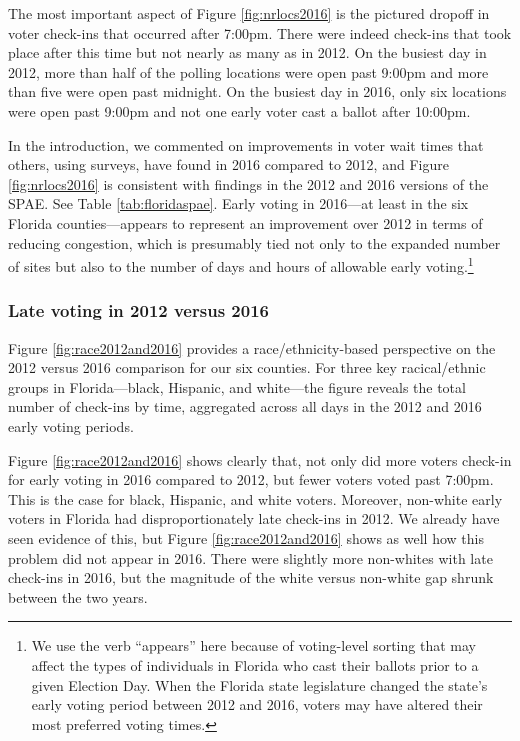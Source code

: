 \documentclass[12pt,titlepage]{article}
\begin{document}
The most important aspect of Figure \ref{fig:nrlocs2016} is the
pictured dropoff in voter check-ins that occurred after 7:00pm.  There
were indeed check-ins that took place after this time but not nearly
as many as in 2012.  On the busiest day in 2012, more than half of the
polling locations were open past 9:00pm and more than five were open
past midnight.  On the busiest day in 2016, only six locations were
open past 9:00pm and not one early voter cast a ballot after 10:00pm.

In the introduction, we commented on improvements in voter wait times
that others, using surveys, have found in 2016 compared to 2012, and
Figure \ref{fig:nrlocs2016} is consistent with findings in the 2012
\citep{spae2012} and 2016 \citep{spae2016} versions of the SPAE.  See
Table \ref{tab:floridaspae}.  Early voting in 2016---at least in the
six Florida counties---appears to represent an improvement over 2012
in terms of reducing congestion, which is presumably tied not only to
the expanded number of sites but also to the number of days and hours
of allowable early voting.\footnote{We use the verb ``appears'' here
  because of voting-level sorting that may affect the types of
  individuals in Florida who cast their ballots prior to a given
  Election Day.  When the Florida state legislature changed the
  state's early voting period between 2012 and 2016, voters may have
  altered their most preferred voting times.}



\subsubsection*{Late voting in 2012 versus 2016}

Figure \ref{fig:race2012and2016} provides a race/ethnicity-based
perspective on the 2012 versus 2016 comparison for our six counties.
For three key racical/ethnic groups in Florida---black, Hispanic, and
white---the figure reveals the total number of check-ins by time,
aggregated across all days in the 2012 and 2016 early voting periods.

Figure \ref{fig:race2012and2016} shows clearly that, not only did more
voters check-in for early voting in 2016 compared to 2012, but fewer
voters voted past 7:00pm.  This is the case for black, Hispanic, and
white voters. Moreover, non-white early voters in Florida had
disproportionately late check-ins in 2012.  We already have seen
evidence of this, but Figure \ref{fig:race2012and2016} shows as well
how this problem did not appear in 2016.  There were slightly more
non-whites with late check-ins in 2016, but the magnitude of the white
versus non-white gap shrunk between the two years.
\end{document}
